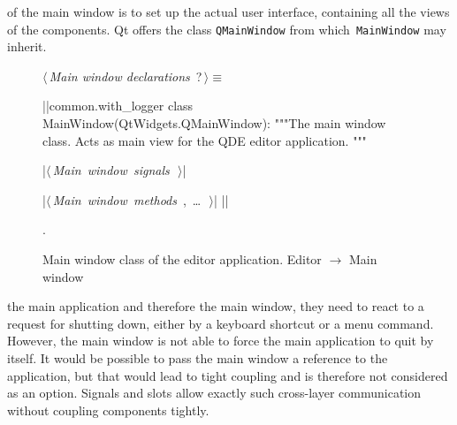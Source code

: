 \documentclass[%
    a4paper,    %
    justified,  %
    nobib,      %
    openany     %
]{tufte-book}
\makeatletter
\renewcommand{\label}[1]{\@tufte@label{##1}}%
\makeatother
\begin{document}
 of the main window is to set up the actual
user interface, containing all the views of the components. Qt offers the class
\verb=QMainWindow= from which~\verb=MainWindow= may inherit.

\begin{figure}
\begin{flushleft} \small
\begin{minipage}{\linewidth}\label{scrap15}\raggedright\small
{} $\langle\,${\itshape Main window declarations}\nobreak\ {\footnotesize {?}}$\,\rangle\equiv$
\vspace{-1ex}
\begin{pythoncode}
|\normalfont{}\fontfamily{}|common.with_logger
class MainWindow(QtWidgets.QMainWindow):
    """The main window class.
    Acts as main view for the QDE editor application.
    """

    |\hbox{$\langle\,${\itshape Main window signals}\nobreak\ {\footnotesize {}}$\,\rangle$}|

    |\hbox{$\langle\,${\itshape Main window methods}\nobreak\ {\footnotesize {}, \ldots\ }$\,\rangle$}|
|\NWsep|
\end{pythoncode}
\vspace{1.5ex}
\footnotesize
\begin{list}{}{\setlength{\itemsep}{-\parsep}\setlength{\itemindent}{-\leftmargin}}
\item {\NWtxtMacroNoRef}.

\item{}
\end{list}
\end{minipage}\vspace{4ex}
\end{flushleft}
\caption{Main window class of the editor application.
  \newline{}\newline{}Editor $\rightarrow$ Main window}
  \label{editor:lst:main-window}
\end{figure}

 the main application and therefore the
main window, they need to react to a request for shutting down, either by a
keyboard shortcut or a menu command. However, the main window is not able to
force the main application to quit by itself. It would be possible to pass the
main window a reference to the application, but that would lead to tight
coupling and is therefore not considered as an option. Signals and slots allow
exactly such cross-layer communication without coupling components tightly.
\end{document}
